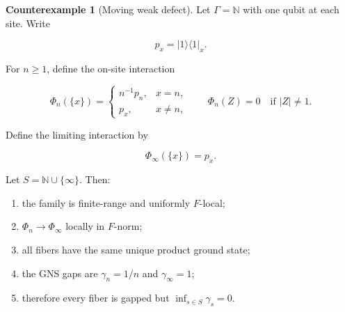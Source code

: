 \documentclass[12pt]{article}
\theoremstyle{definition}
\newtheorem{counterexample}[theorem]{Counterexample}
\theoremstyle{remark}
\begin{document}
\begin{counterexample}[Moving weak defect]
\label{cex:moving-defect}
Let $\Gamma=\mathbb N$ with one qubit at each site.  Write

\begin{equation}
  p_x=|1\rangle\langle1|_x.
\end{equation}

For $n\ge1$, define the on-site interaction

\begin{equation}
  \Phi_n(\{x\})=
  \begin{cases}
  n^{-1}p_n,&x=n,\\
  p_x,&x\ne n,
  \end{cases}
  \qquad
  \Phi_n(Z)=0\quad\text{if }|Z|\ne1.
  \label{eq:defect-n}
\end{equation}

Define the limiting interaction by

\begin{equation}
  \Phi_\infty(\{x\})=p_x.
  \label{eq:defect-infty}
\end{equation}

Let $S=\mathbb N\cup\{\infty\}$.  Then:

\begin{enumerate}[leftmargin=2.3em]
\item the family is finite-range and uniformly $F$-local;
\item $\Phi_n\to\Phi_\infty$ locally in $F$-norm;
\item all fibers have the same unique product ground state;
\item the GNS gaps are $\gamma_n=1/n$ and $\gamma_\infty=1$;
\item therefore every fiber is gapped but
$\inf_{s\in S}\gamma_s=0$.
\end{enumerate}
\end{counterexample}
\end{document}
